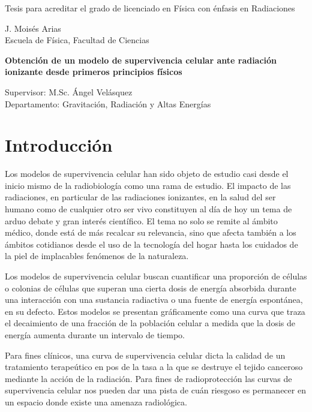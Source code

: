 \documentclass[12pt,letterpaper, oneside]{book}
\begin{document}
\begin{titlepage}
\begin{center}
			\vspace{0.75cm}
			\Large Tesis para acreditar el grado de licenciado en Física con énfasis en Radiaciones\\
			
			\vspace{1.25cm}		
			
			\large{J. Moisés Arias}\\
			\small{Escuela de Física, Facultad de Ciencias}
			
			\vfill
			
			\large{\textbf{Obtención de un modelo de supervivencia celular ante radiación ionizante desde primeros principios físicos}}
			\vspace{0.75cm}
			
			\large Supervisor: M.Sc. Ángel Velásquez\\
			Departamento: Gravitación, Radiación y Altas Energías
		\end{center}
	\end{titlepage}
	
	\tableofcontents
	
	\chapter*{Introducción}
	
	Los modelos de supervivencia celular han sido objeto de estudio casi desde el inicio mismo de la radiobiología como una rama de estudio. El impacto de las radiaciones, en particular de las radiaciones ionizantes, en la salud del ser humano como de cualquier otro ser vivo constituyen al día de hoy un tema de arduo debate y gran interés científico. El tema no solo se remite al ámbito médico, donde está de más recalcar su relevancia, sino que afecta también a los ámbitos cotidianos desde el uso de la tecnología del hogar hasta los cuidados de la piel de implacables fenómenos de la naturaleza. 
	
	Los modelos de supervivencia celular buscan cuantificar una proporción de células o colonias de células que superan una cierta dosis de energía absorbida durante una interacción con una sustancia radiactiva o una fuente de energía espontánea, en su defecto. Estos modelos se presentan gráficamente como una curva que traza el decaimiento de una fracción de la población celular a medida que la dosis de energía aumenta durante un intervalo de tiempo. 
	
	Para fines clínicos, una curva de supervivencia celular dicta la calidad de un tratamiento terapeútico en pos de la tasa a la que se destruye el tejido canceroso mediante la acción de la radiación. Para fines de radioprotección las curvas de supervivencia celular nos pueden dar una pista de cuán riesgoso es permanecer en un espacio donde existe una amenaza radiológica. 
	
\end{document}
